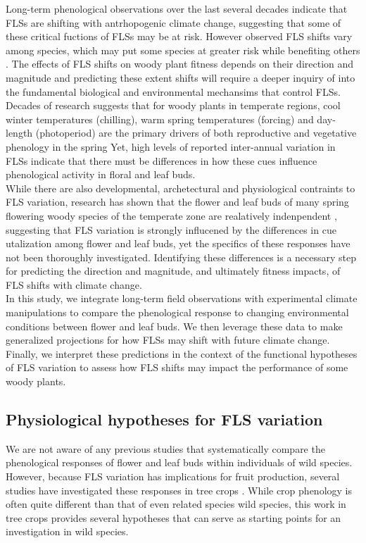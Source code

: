 \documentclass[11pt]{article}
\begin{document}
\noindent Long-term phenological observations over the last several decades indicate that FLSs are shifting with antrhopogenic climate change, suggesting that some of these critical fuctions of FLSs may be at risk. However observed FLS shifts vary among species, which may put some species at greater risk while benefiting others \citep{Buonaiuto2020}. The effects of FLS shifts on woody plant fitness depends on their direction and magnitude and predicting these extent shifts will require a deeper inquiry of into the fundamental biological and environmental mechansims that control FLSs.\\ 
\noindent Decades of research suggests that for woody plants in temperate regions, cool winter temperatures (chilling), warm spring temperatures (forcing) and day-length (photoperiod) are the primary drivers of both reproductive and vegetative phenology in the spring \citep{Forrest2018,Flynn2018}  Yet, high levels of reported inter-annual variation in FLSs \citep{Buonaiuto2020} indicate that there must be differences in how these cues influence phenological activity in floral and leaf buds.\\
 
\noindent While there are also developmental, archetectural and physiological contraints to FLS variation, research has shown that the flower and leaf buds of many spring flowering woody species of the temperate zone are realatively indenpendent \citep{}, suggesting that FLS variation is strongly influcened by the differences in cue utalization among flower and leaf buds, yet the specifics of these responses have not been thoroughly investigated. Identifying these differences is a necessary step for predicting the direction and magnitude, and ultimately fitness impacts, of FLS shifts with climate change.\\

\noindent In this study, we integrate long-term field observations with experimental climate manipulations to compare the phenological response to changing environmental conditions between flower and leaf buds. We then leverage these data to make generalized projections for how FLSs may shift with future climate change. Finally, we interpret these predictions in the context of the functional hypotheses of FLS variation to assess how FLS shifts may impact the performance of some woody plants.\\  

\subsection*{Physiological hypotheses for FLS variation}
\noindent We are not aware of any previous studies that systematically compare the phenological responses of flower and leaf buds within individuals of wild species. However, because FLS variation has implications for fruit production, several studies have investigated these responses in tree crops \citep[see][]{Guo_2014,Garigalio2016,Citadin2001}. While crop phenology is often quite different than that of even related species wild species, this work in tree crops provides several hypotheses that can serve as starting points for an investigation in wild species.\\
\end{document}
